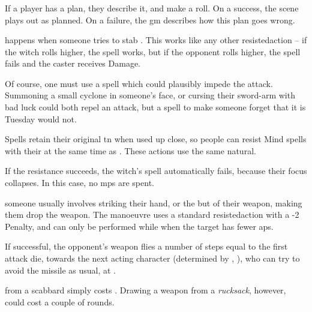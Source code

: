 \begin{multicols}{2}
\subsubsection{}

If a player has a plan, they describe it, and make a roll.
On a success, the scene plays out as planned.
On a failure, the \gls{gm} describes how this plan goes wrong.

happens when someone tries to stab .
This works like any other \gls{resistedaction} -- if the \gls{witch} rolls higher, the spell works, but if the opponent rolls higher, the spell fails and the caster receives Damage.


Of course, one must use a spell which could plausibly impede the attack.
Summoning a small cyclone in someone's face, or cursing their sword-arm with bad luck could both repel an attack, but a spell to make someone forget that it is Tuesday would not.

Spells retain their original \gls{tn} when used up close, so people can resist Mind spells with their  at the same time as .
These actions use the same \gls{natural}.

If the  resistance succeeds, the \gls{witch}'s spell automatically fails, because their focus collapses.
In this case, no \glspl{mp} are spent.

someone usually involves striking their hand, or the but of their weapon, making them drop the weapon.
The manoeuvre uses a standard  \gls{resistedaction} with a -2 Penalty, and can only be performed while when the target has fewer \glspl{ap}.

If successful, the opponent's weapon flies a number of \glspl{step} equal to the first attack die, towards the next acting character (determined by , ), who can try to avoid the missile as usual, at \tn[12].

from a scabbard simply costs .
Drawing a weapon from a \textit{rucksack}, however, could cost a couple of \glspl{round}.


\end{multicols}
